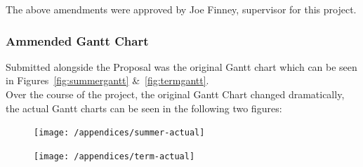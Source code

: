 \documentclass[preprint,12pt,3p]{elsarticle}
\begin{document}
\begin{appendices}
The above amendments were approved by Joe Finney, supervisor for this project.

\clearpage
\subsubsection{Ammended Gantt Chart}
Submitted alongside the Proposal was the original Gantt chart which can be seen in Figures~\ref{fig:summergantt} \&~\ref{fig:termgantt}.\\
Over the course of the project, the original Gantt Chart changed dramatically, the actual Gantt charts can be seen in the following two figures:
\begin{figure}[H]
    \centering
    \texttt{[image: /appendices/summer-actual]}
\end{figure}
\begin{figure}[H]
    \centering
    \texttt{[image: /appendices/term-actual]}
\end{figure}
\end{appendices}
\end{document}
